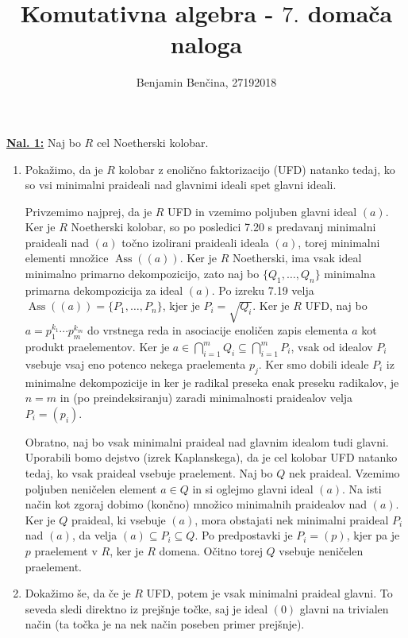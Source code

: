 \documentclass[a4paper, 12pt]{article}
\title{Komutativna algebra - $7.$ domača naloga}
\author{Benjamin Benčina, 27192018}
\DeclareMathOperator{\Ass}{Ass}
\begin{document}
\maketitle

\underline{\textbf{Nal. 1:}}
Naj bo $R$ cel Noetherski kolobar.
\begin{enumerate}[label=(\alph*)]
	\item Pokažimo, da je $R$ kolobar z enolično faktorizacijo (UFD) natanko tedaj, ko so vsi minimalni praideali nad glavnimi ideali spet glavni ideali.
	
	Privzemimo najprej, da je $R$ UFD in vzemimo poljuben glavni ideal $(a)$. Ker je $R$ Noetherski kolobar, so po posledici 7.20 s predavanj minimalni praideali nad $(a)$ točno izolirani praideali ideala $(a)$, torej minimalni elementi množice $\Ass((a))$. Ker je $R$ Noetherski, ima vsak ideal minimalno primarno dekompozicijo, zato naj bo $\lbrace Q_1, \dots, Q_n\rbrace$ minimalna primarna dekompozicija za ideal $(a)$. Po izreku 7.19 velja $\Ass((a)) = \lbrace P_1, \dots, P_n \rbrace$, kjer je $P_i = \sqrt{Q_i}$.
	Ker je $R$ UFD, naj bo $a = p_1^{k_1}\cdots p_m^{k_m}$ do vrstnega reda in asociacije enoličen zapis elementa $a$ kot produkt praelementov. Ker je $a \in \bigcap_{i=1}^m Q_i \subseteq \bigcap_{i=1}^m P_i$, vsak od idealov $P_i$ vsebuje vsaj eno potenco nekega praelementa $p_j$. Ker smo dobili ideale $P_i$ iz minimalne dekompozicije in ker je radikal preseka enak preseku radikalov, je $n=m$ in (po preindeksiranju) zaradi minimalnosti praidealov velja $P_i = (p_i)$.
	
	Obratno, naj bo vsak minimalni praideal nad glavnim idealom tudi glavni. Uporabili bomo dejstvo (izrek Kaplanskega), da je cel kolobar UFD natanko tedaj, ko vsak praideal vsebuje praelement. Naj bo $Q$ nek praideal. Vzemimo poljuben neničelen element $a \in Q$ in si oglejmo glavni ideal $(a)$. Na isti način kot zgoraj dobimo (končno) množico minimalnih praidealov nad $(a)$. Ker je $Q$ praideal, ki vsebuje $(a)$, mora obstajati nek minimalni praideal $P_i$ nad $(a)$, da velja $(a) \subseteq P_i \subseteq Q$. Po predpostavki je $P_i = (p)$, kjer pa je $p$ praelement v $R$, ker je $R$ domena. Očitno torej $Q$ vsebuje neničelen praelement.
	
	\item Dokažimo še, da če je $R$ UFD, potem je vsak minimalni praideal glavni. To seveda sledi direktno iz prejšnje točke, saj je ideal $(0)$ glavni na trivialen način (ta točka je na nek način poseben primer prejšnje). 
\end{enumerate}
\end{document}
